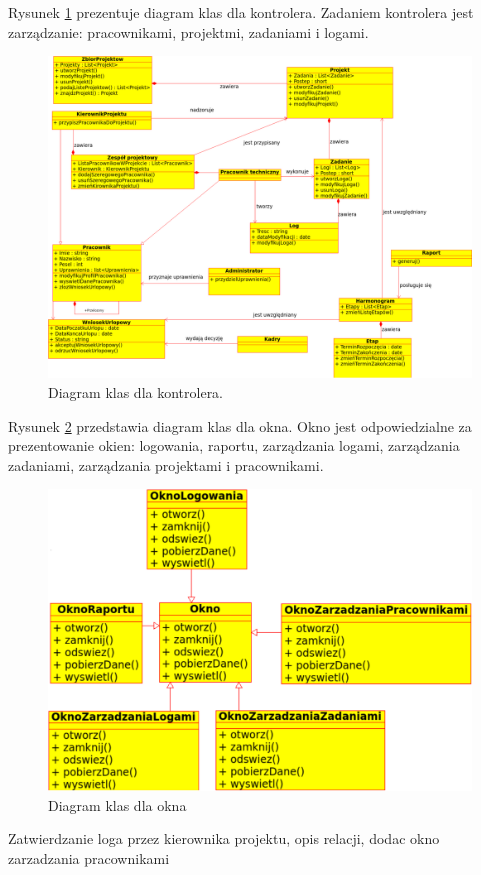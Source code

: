 \begin{adjustwidth}{4em}{0pt}
Rysunek \ref{fig:KontrolerDiagramKlas} prezentuje diagram klas dla kontrolera. Zadaniem kontrolera jest zarządzanie: pracownikami, projektmi, zadaniami i logami.

\begin{figure}[H]
    \centering
    \includegraphics[scale=0.4]{diagramy/modelKlas/KontrolerDiagramKlas}
    \caption{Diagram klas dla kontrolera.}
    \label{fig:KontrolerDiagramKlas}
\end{figure}

Rysunek \ref{fig:OknoDiagramKlas} przedstawia diagram klas dla okna. 
Okno jest odpowiedzialne za prezentowanie okien: logowania, raportu, zarządzania logami, zarządzania zadaniami, zarządzania projektami i pracownikami.


\begin{figure}[H]
    \centering
    \includegraphics[scale=0.7]{diagramy/modelKlas/OknoDiagramKlas}
    \caption{Diagram klas dla okna}
    \label{fig:OknoDiagramKlas}
\end{figure}

Zatwierdzanie loga przez kierownika projektu, opis relacji, dodac okno zarzadzania pracownikami
\end{adjustwidth}